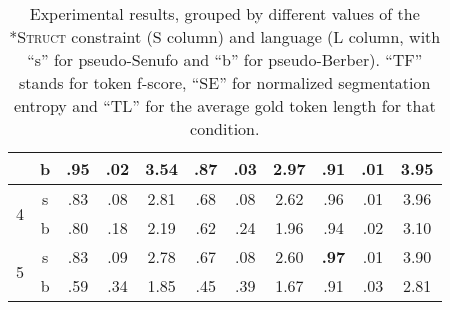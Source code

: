 \documentclass[11pt]{article}
\begin{document}
\begin{table}[t!]
\begin{center}
{\begin{tabular}{|c|c||c|c|c||c|c|c||c|c|c|}
\cline{2-11} 
 & b & \textbf{.95} & .02 & 3.54 & .87 & .03 & 2.97 & .91 & .01 & 3.95\tabularnewline
\hline 
\hline 
\multirow{2}{*}{4} & s & .83 & .08 & 2.81 & .68 & .08 & 2.62 & .96 & .01 & 3.96\tabularnewline
\cline{2-11} 
 & b & .80 & .18 & 2.19 & .62 & .24 & 1.96 & .94 & .02 & 3.10\tabularnewline
\hline 
\hline 
\multirow{2}{*}{5} & s & .83 & .09 & 2.78 & .67 & .08 & 2.60 & \textbf{.97}  & .01 & 3.90\tabularnewline
\cline{2-11} 
 & b & .59  & .34 & 1.85 & .45 & .39 & 1.67 & .91  & .03 & 2.81\tabularnewline
\hline 
\end{tabular}}
\end{center}
\caption{\label{Results.}Experimental results, grouped by different values of the \textsc{*Struct} constraint (S column) and language (L column, with ``s'' for pseudo-Senufo and ``b'' for pseudo-Berber). ``TF'' stands for token f-score, ``SE'' for normalized segmentation entropy and ``TL'' for the average gold token length for that condition.}	
\end{table}
\end{document}
